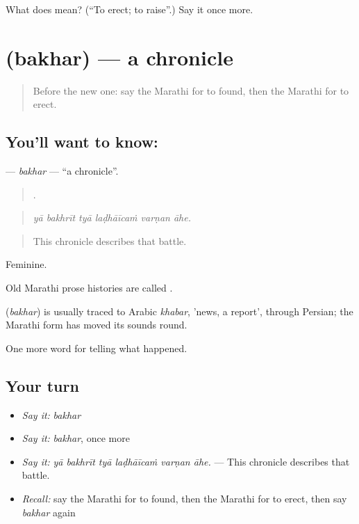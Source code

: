 \begin{tcolorbox}[breakable,colback=teal!4,colframe=teal!35!black,title={Before you move on}]
What does  mean? (\textquotedblleft{}To erect; to raise\textquotedblright{}.) Say it once more.
\end{tcolorbox}
\section[\texorpdfstring{\mr{बखर} (bakhar)}{बखर (bakhar)}]{ (bakhar) — a chronicle}

\label{lesson:MR-C334-bakhar}



\begin{quote}
Before the new one: say the Marathi for to found, then the Marathi for to erect.
\end{quote}

\subsection*{You'll want to know: }
\textbf{} — \emph{bakhar} — \textquotedblleft{}a chronicle\textquotedblright{}.

\begin{quote}
     .
\end{quote}

\begin{quote}
\emph{yā bakhrīt tyā laḍhāīcaṁ varṇan āhe.}
\end{quote}

\begin{quote}
This chronicle describes that battle.
\end{quote}

Feminine.

Old Marathi prose histories are called .

\begin{cousinweb}
\textbf{} (\emph{bakhar}) is usually traced to Arabic \emph{khabar}, 'news, a report', through Persian; the Marathi form has moved its sounds round.
\end{cousinweb}

\begin{grammarlens}[title={What you've built}]
One more word for telling what happened.
\end{grammarlens}

\subsection*{Your turn}
\begin{itemize}
\raggedright
  \item \emph{Say it:} \emph{bakhar}
  \item \emph{Say it:} \emph{bakhar}, once more
  \item \emph{Say it:} \emph{yā bakhrīt tyā laḍhāīcaṁ varṇan āhe.} — This chronicle describes that battle.
  \item \emph{Recall:} say the Marathi for to found, then the Marathi for to erect, then say \emph{bakhar} again
\end{itemize}

